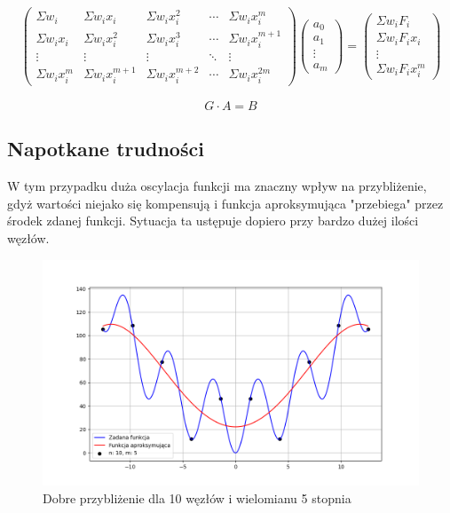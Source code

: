 \documentclass{article}
\begin{document}
\begin{gather*}
\begin{pmatrix}
\Sigma w_i & \Sigma w_ix_i & \Sigma w_ix_i^2 & \cdots & \Sigma w_ix_i^m \\
\Sigma w_ix_i & \Sigma w_ix_i^2 & \Sigma w_ix_i^3 & \cdots & \Sigma w_ix_i^{m+1} \\
\vdots & \vdots & \vdots & \ddots & \vdots \\
\Sigma w_ix_i^m & \Sigma w_ix_i^{m+1} & \Sigma w_ix_i^{m+2} & \cdots & \Sigma w_ix_i^{2m} 
\end{pmatrix} 
\begin{pmatrix}
a_0 \\
a_1 \\
\vdots \\
a_m 
\end{pmatrix}
= 
\begin{pmatrix}
\Sigma w_iF_i \\
\Sigma w_iF_ix_i \\
\vdots \\
\Sigma w_iF_ix_i^m 
\end{pmatrix}
\end{gather*}

\[G \cdot A=B\]

\subsection{Napotkane trudności}

W tym przypadku duża oscylacja funkcji ma znaczny wpływ na przybliżenie, gdyż wartości niejako się kompensują i funkcja aproksymująca "przebiega" przez środek zdanej funkcji. Sytuacja ta ustępuje dopiero przy bardzo dużej ilości węzłów.

\begin{figure}[H]
\centering
  \begin{minipage}[b]{0.49\textwidth}
    \includegraphics[width=\textwidth]{img26_n=10_m=5.png}
    \caption{Dobre przybliżenie dla 10 węzłów i wielomianu 5 stopnia}
  \end{minipage}
\end{figure}
\end{document}
